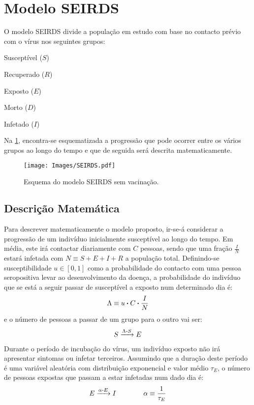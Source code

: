 \section{Modelo SEIRDS}
O modelo SEIRDS divide a população em estudo com base no contacto prévio com o vírus nos seguintes grupos:
\begin{itemize}\begin{multicols}{3}
        \item Susceptível ($S$)
        \item Recuperado ($R$)
        \item Exposto ($E$)
        \item Morto ($D$)
        \item Infetado ($I$)
\end{multicols}\end{itemize}

Na \ref{fig:Model}, encontra-se esquematizada a progressão que pode ocorrer entre os vários grupos ao longo do tempo e que de seguida será descrita matematicamente.
\begin{figure}[H]\centering
        \texttt{[image: Images/SEIRDS.pdf]}
        \caption{Esquema do modelo SEIRDS sem vacinação.}
\label{fig:Model}\end{figure}

\subsection{Descrição Matemática}
Para descrever matematicamente o modelo proposto, ir-se-á considerar a progressão de um indivíduo inicialmente susceptível ao longo do tempo.
Em média, este irá contactar diariamente com $C$ pessoas, sendo que uma fração $\frac{I}{N}$ estará infetada com $N\equiv S+E+I+R$ a população total.
Definindo-se susceptibilidade $u\in[0,1]$ como a probabilidade do contacto com uma pessoa seropositiva levar ao desenvolvimento da doença, a probabilidade do indivíduo que se está a seguir passar de susceptível a exposto num determinado dia é:
\begin{equation*}
        \Lambda \equiv u\vdot C \vdot \frac{I}{N}
\end{equation*}
e o número de pessoas a passar de um grupo para o outro vai ser:
\begin{equation*}
        S \xrightarrow{\Lambda\vdot S} E
\end{equation*}

Durante o período de incubação do vírus, um indivíduo exposto não irá apresentar sintomas ou infetar terceiros.
Assumindo que a duração deste período é uma variável aleatória com distribuição exponencial e valor médio $\tau_E$, o número de pessoas expostas que passam a estar infetadas num dado dia é:
\begin{equation*}
        E \xrightarrow{\alpha\vdot E} I
        \qquad\qquad
        \alpha \equiv \frac{1}{\tau_E}
\end{equation*}

